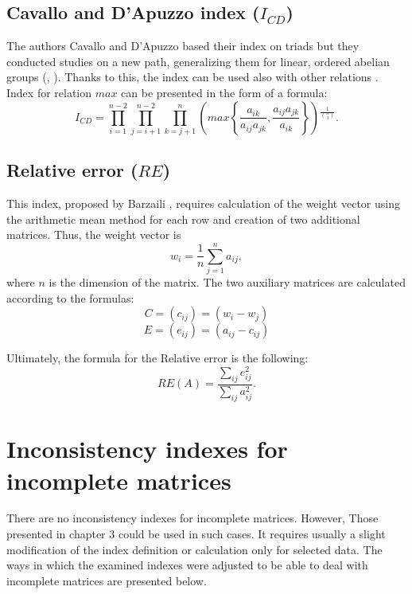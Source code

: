 \subsection{Cavallo and D’Apuzzo index ($I_{CD}$)}

The authors Cavallo and D'Apuzzo based their index on triads but they conducted studies on a new path, generalizing them for linear, ordered abelian groups (\cite{Cavallo2009}, \cite{Cavallo2010}). Thanks to this, the index can be used also with other relations \cite{Brunelli2013}. Index for relation $max$ can be presented in the form of a formula:
	\begin{equation} 
		\label{eq:CavDAp}
		I_{CD}=\prod_{i=1}^{n-2}\prod_{j=i+1}^{n-2}\prod_{k=j+1}^{n}\left(max\left\{ \frac{a_{ik}}{a_{ij}a_{jk}},\frac{a_{ij}a_{jk}}{a_{ik}}\right\} \right){}^{\frac{1}{\binom{n}{3}}}.
	 \end{equation}
 

\subsection{Relative error ($RE$)}

This index, proposed by Barzaili \cite{Jonathan1998}, requires calculation of the weight vector using the arithmetic mean method for each row and creation of two additional matrices. Thus, the weight vector is $$w_{i}=\frac{1}{n}\sum_{j=1}^{n}a_{ij},$$ where $n$ is the dimension of the matrix. The two auxiliary matrices are calculated according to the formulas:
$$C=\left(c_{ij}\right)=\left(w_{i}-w_{j}\right)$$
$$E=\left(e_{ij}\right)=\left(a_{ij}-c_{ij}\right)$$

Ultimately, the formula for the Relative error is the following:
	\begin{equation} 
		RE(A)=\frac{\sum_{ij}e_{ij}^{2}}{\sum_{ij}a_{ij}^{2}}.
	 \end{equation}


\section{Inconsistency indexes for incomplete matrices}
\label{sec:inconsistencyIndexesForIncompleteMatrices}

There are no inconsistency indexes for incomplete matrices. However, Those presented in chapter 3 could be used in such cases. It requires usually a slight modification of the index definition or calculation only for selected data. The ways in which the examined indexes were adjusted to be able to deal with incomplete matrices are presented below.

